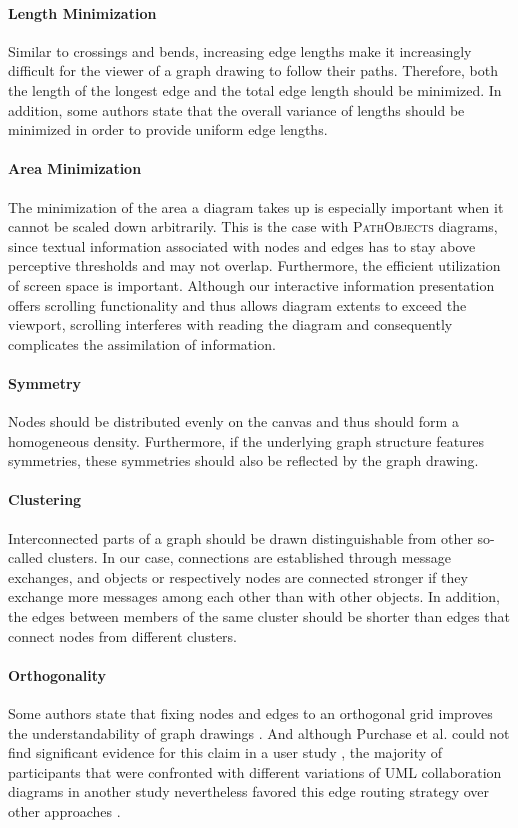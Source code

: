 \paragraph{Length Minimization} Similar to crossings and bends, increasing edge lengths make it increasingly difficult for the viewer of a graph drawing to follow their paths.
Therefore, both the length of the longest edge and the total edge length should be minimized.
In addition, some authors state that the overall variance of lengths should be minimized in order to provide uniform edge lengths.

\paragraph{Area Minimization} The minimization of the area a diagram takes up is especially important when it cannot be scaled down arbitrarily.
This is the case with \textsc{PathObjects} diagrams, since textual information associated with nodes and edges has to stay above perceptive thresholds and may not overlap.
Furthermore, the efficient utilization of screen space is important.
Although our interactive information presentation offers scrolling functionality and thus allows diagram extents to exceed the viewport, scrolling interferes with reading the diagram and consequently complicates the assimilation of information.

\paragraph{Symmetry} Nodes should be distributed evenly on the canvas and thus should form a homogeneous density.
Furthermore, if the underlying graph structure features symmetries, these symmetries should also be reflected by the graph drawing.

\paragraph{Clustering} Interconnected parts of a graph should be drawn distinguishable from other so-called clusters.
In our case, connections are established through message exchanges, and objects or respectively nodes are connected stronger if they exchange more messages among each other than with other objects.
In addition, the edges between members of the same cluster should be shorter than edges that connect nodes from different clusters.

\paragraph{Orthogonality} Some authors state that fixing nodes and edges to an orthogonal grid improves the understandability of graph drawings \cite{sugiyama_methods_1981, batini_what_1985}.
And although Purchase et al. could not find significant evidence for this claim in a user study \cite{purchase_which_1997}, the majority of participants that were confronted with different variations of UML collaboration diagrams in another study nevertheless favored this edge routing strategy over other approaches \cite{purchase_graph_2004}.
